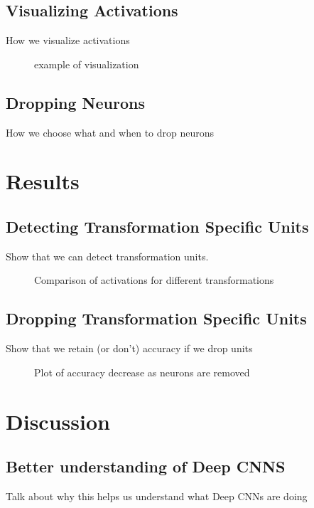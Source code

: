 \documentclass[10pt,twocolumn,letterpaper]{article}
\begin{document}
\subsection{Visualizing Activations}
How we visualize activations
\begin{figure}
\caption{example of visualization}
\label{fig:vis}
\end{figure}

\subsection{Dropping Neurons}
How we choose what and when to drop neurons

\section{Results}

\subsection{Detecting Transformation Specific Units}
Show that we can detect transformation units.

\begin{figure}
\caption{Comparison of activations for different transformations}
\label{fig:comp}
\end{figure}

\subsection{Dropping Transformation Specific Units}
Show that we retain (or don't) accuracy if we drop units

\begin{figure}
\caption{Plot of accuracy decrease as neurons are removed}
\label{fig:comp}
\end{figure}

\section{Discussion}

\subsection{Better understanding of Deep CNNS}
Talk about why this helps us understand what Deep CNNs are doing
\end{document}
